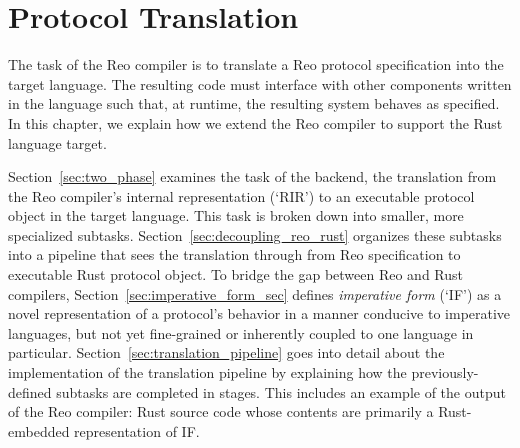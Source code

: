 \chapter{Protocol Translation}
\label{sec:imperative_form}

The task of the Reo compiler is to translate a Reo protocol specification into the target language. The resulting code must interface with other components written in the language such that, at runtime, the resulting system behaves as specified. In this chapter, we explain how we extend the Reo compiler to support the Rust language target.

Section~\ref{sec:two_phase} examines the task of the backend, the translation from the Reo compiler's internal representation (`RIR') to an executable protocol object in the target language. This task is broken down into smaller, more specialized subtasks. Section~\ref{sec:decoupling_reo_rust} organizes these subtasks into a pipeline that sees the translation through from Reo specification to executable Rust protocol object. To bridge the gap between Reo and Rust compilers, Section~\ref{sec:imperative_form_sec} defines \textit{imperative form} (`IF') as a novel representation of a protocol's behavior in a manner conducive to imperative languages, but not yet fine-grained or inherently coupled to one language in particular. Section~\ref{sec:translation_pipeline} goes into detail about the implementation of the translation pipeline by explaining how the previously-defined subtasks are completed in stages. This includes an example of the output of the Reo compiler: Rust source code whose contents are primarily a Rust-embedded representation of IF.

